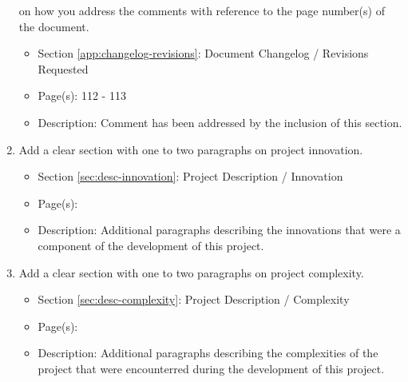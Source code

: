 \documentclass[11pt]{article}
\begin{document}
\begin{enumerate}
          on how you address the comments with reference to the page number(s)
          of the document.
          \begin{itemize}
            \item Section \ref{app:changelog-revisions}: Document Changelog / Revisions Requested
            \item Page(s): 112 - 113
            \item Description: Comment has been addressed by the inclusion of
              this section.
          \end{itemize}
        \item Add a clear section with one to two paragraphs on project
          innovation.
          \begin{itemize}
            \item Section \ref{sec:desc-innovation}: Project Description /
              Innovation
            \item Page(s): \pageref{sec:desc-innovation}
            \item Description: Additional paragraphs describing the innovations
              that were a component of the development of this project.
          \end{itemize}
        \item Add a clear section with one to two paragraphs on project
          complexity.
          \begin{itemize}
            \item Section \ref{sec:desc-complexity}: Project Description /
              Complexity
            \item Page(s): \pageref{sec:desc-complexity}
            \item Description: Additional paragraphs describing the complexities
              of the project that were encounterred during the development of
              this project.
          \end{itemize}
      \end{enumerate}
\end{document}
